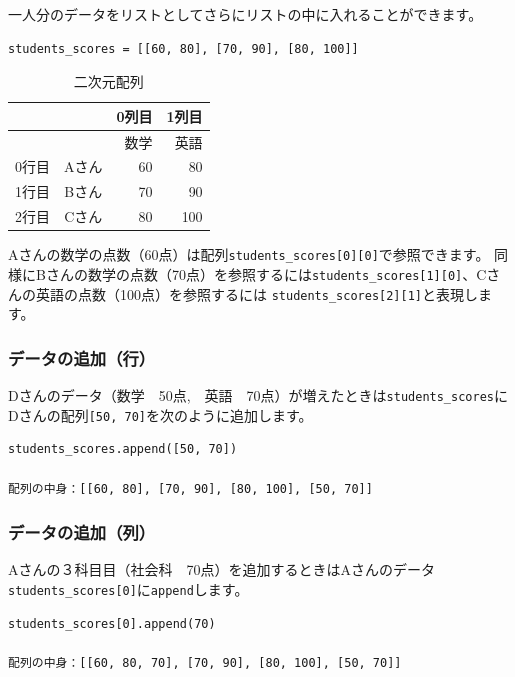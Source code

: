 \documentclass[11pt,a4paper,dvipdfmx,titlepage]{jsreport}
\begin{document}
一人分のデータをリストとしてさらにリストの中に入れることができます。

\begin{verbatim}
students_scores = [[60, 80], [70, 90], [80, 100]]
\end{verbatim}
\begin{table}[h]
 \begin{center}
    \caption{二次元配列}
\begin{tabular}{r|c|r|r|} 
 & & 0列目 &1列目\\ \hline 
 & & 数学 &英語\\ \hline 
0行目 & Aさん &  60& 80\\ \hline
1行目 & Bさん &  70& 90\\ \hline
2行目 & Cさん &  80& 100\\ \hline
\end{tabular}
\end{center}
\end{table}

Aさんの数学の点数（60点）は配列{\tt students\_scores[0][0]}で参照できます。
同様にBさんの数学の点数（70点）を参照するには{\tt students\_scores[1][0]}、Cさんの英語の点数（100点）を参照するには
{\tt students\_scores[2][1]}と表現します。

\subsubsection{データの追加（行）}

Dさんのデータ（数学　50点,　英語　70点）が増えたときは{\tt students\_scores}にDさんの配列{\tt [50, 70]}を次のように追加します。


\begin{verbatim}
students_scores.append([50, 70])

配列の中身：[[60, 80], [70, 90], [80, 100], [50, 70]]
\end{verbatim}

\subsubsection{データの追加（列）}

Aさんの３科目目（社会科　70点）を追加するときはAさんのデータ{\tt students\_scores[0]}に{\tt append}します。

\begin{verbatim}
students_scores[0].append(70)

配列の中身：[[60, 80, 70], [70, 90], [80, 100], [50, 70]]
\end{verbatim}
\end{document}
